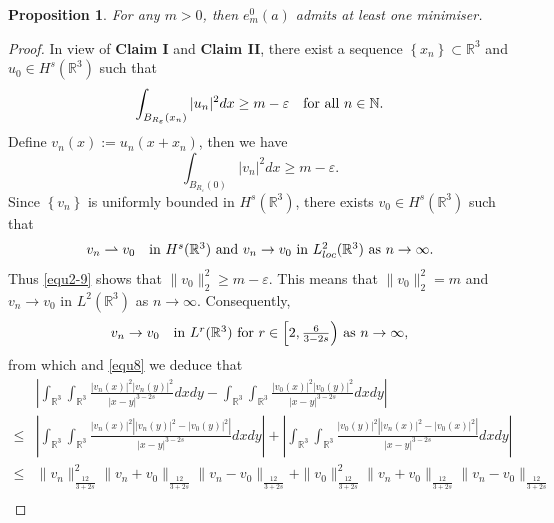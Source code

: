 \documentclass[reqno, 11pt]{amsart} %
\numberwithin{equation}{section}
\newtheorem{proposition}[theorem]{Proposition}
\begin{document}
	\begin{proposition}\label{lem2-2}
		For any $m>0$, then $e^{0}_{m}(a)$ admits at least one minimiser.
	\end{proposition}
	\begin{proof}
		In view of {\bf  Claim I} and {\bf  Claim II}, there exist a sequence $\left\lbrace x_{n}\right\rbrace \subset\mathbb{R}^{3}$ and $u_{0}\in H^{s}(\mathbb{R}^{3})$ such that
		\begin{equation*}
			\int_{B_{R_{\varepsilon}}(x_{n})}|u_{n}|^{2}dx\geq m-\varepsilon\quad \hbox{for all $n\in\mathbb{N}$}.
		\end{equation*}
		Define $v_{n}(x):=u_{n}(x+x_{n})$, then we have
		\begin{equation}\label{equ2-12}
			\int_{B_{R_{\varepsilon}}(0)}|v_{n}|^{2}dx\geq m-\varepsilon.
		\end{equation}
		Since $\left\lbrace v_{n}\right\rbrace $ is uniformly bounded in $H^{s}(\mathbb{R}^{3})$, there exists $v_{0}\in H^{s}(\mathbb{R}^{3})$ such that
		\begin{equation*}
			v_{n}\rightharpoonup v_{0} \quad  \hbox{in $H^{s}(\mathbb{R}^{3})$ and $v_{n}\rightarrow v_{0}$ in $L^{2}_{loc}(\mathbb{R}^{3})$ as $n\rightarrow\infty$}.
		\end{equation*}
		Thus \eqref{equ2-9} shows that $\| v_{0}\|_{2}^{2}\geq m-\varepsilon$. This means that $\| v_{0}\|_{2}^{2}=m$ and $v_{n}\rightarrow v_{0}$ in $L^{2}(\mathbb{R}^{3})$ as $n\rightarrow\infty$. Consequently, 
		\begin{equation*}
			v_{n}\rightarrow v_{0}\quad  \hbox{in $L^{r}(\mathbb{R}^{3})$ for $r\in \left[ 2, \frac{6}{3-2s}\right) $ as $n\rightarrow\infty$},
		\end{equation*}
		from which and \eqref{equ8} we deduce that
		\begin{equation*}
			\begin{split}
				&	\left| \int_{\mathbb{R}^{3}}\int_{\mathbb{R}^{3}}\frac{|v_{n}(x)|^{2}|v_{n}(y)|^{2}}{|x-y|^{3-2s}}dxdy-\int_{\mathbb{R}^{3}}\int_{\mathbb{R}^{3}}\frac{|v_{0}(x)|^{2}|v_{0}(y)|^{2}}{|x-y|^{3-2s}}dxdy\right| \\
				\leq&\left| \int_{\mathbb{R}^{3}}\int_{\mathbb{R}^{3}}\frac{|v_{n}(x)|^{2}\left||v_{n}(y)|^{2}-|v_{0}(y)|^{2} \right| }{|x-y|^{3-2s}}dxdy\right| +\left| \int_{\mathbb{R}^{3}}\int_{\mathbb{R}^{3}}\frac{|v_{0}(y)|^{2}\left||v_{n}(x)|^{2}-|v_{0}(x)|^{2} \right| }{|x-y|^{3-2s}}dxdy\right|\\
				\leq& \| v_{n}\|_{\frac{12}{3+2s}}^{2}\| v_{n}+v_{0}\|_{\frac{12}{3+2s}}\| v_{n}-v_{0}\|_{\frac{12}{3+2s}}+\| v_{0}\|_{\frac{12}{3+2s}}^{2}\| v_{n}+v_{0}\|_{\frac{12}{3+2s}}\| v_{n}-v_{0}\|_{\frac{12}{3+2s}}\\

\end{split}
\end{equation*}
\end{proof}
\end{document}
